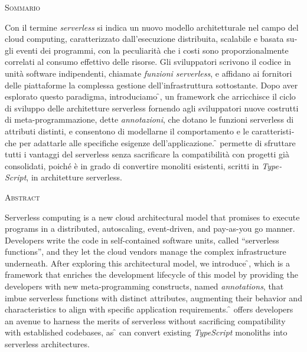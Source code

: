 \begin{center}
  \textsc{Sommario}
\end{center}
%
\noindent
%
\begin{otherlanguage}{italian}
Con il termine \textit{serverless} si indica un nuovo modello architetturale nel campo del cloud computing,
caratterizzato dall'esecuzione distribuita, scalabile e basata sugli eventi dei programmi,
con la peculiarità che i costi sono proporzionalmente correlati al consumo effettivo delle risorse.
Gli sviluppatori scrivono il codice in unità software indipendenti, chiamate \textit{funzioni serverless},
e affidano ai fornitori delle piattaforme la complessa gestione dell'infrastruttura sottostante.
Dopo aver esplorato questo paradigma, introduciamo \f{},
un framework che arricchisce il ciclo di sviluppo delle architetture serverless fornendo agli sviluppatori
nuove costrutti di meta-programmazione, dette \textit{annotazioni},
che dotano le funzioni serverless di attributi distinti,
e consentono di modellarne il comportamento e le caratteristiche per adattarle alle specifiche esigenze dell'applicazione.
\f{} permette di sfruttare tutti i vantaggi del serverless
senza sacrificare la compatibilità con progetti già consolidati,
poiché è in grado di convertire monoliti esistenti, scritti in \textit{TypeScript}, in architetture serverless.
\end{otherlanguage}

\newpage


\begin{center}
  \textsc{Abstract}
\end{center}
%
\noindent
%
Serverless computing is a new cloud architectural model that promises
to execute programs in a distributed, autoscaling, event-driven, and pay-as-you go manner.
Developers write the code in self-contained software units, called ``serverless functions'',
and they let the cloud vendors manage the complex infrastructure underneath.
After exploring this architectural model, we introduce \f{}, which is a framework that enriches the development
lifecycle of this model by providing the developers with new
meta-programming constructs, named \textit{annotations},
that imbue serverless functions with distinct attributes,
augmenting their behavior and characteristics to align with specific application requirements.
\f{} offers developers an avenue to harness the merits of serverless
without sacrificing compatibility with established codebases, as \f{} can convert
existing \textit{TypeScript} monoliths into serverless architectures.

\newpage
\
\thispagestyle{empty}
\cleardoublepage
